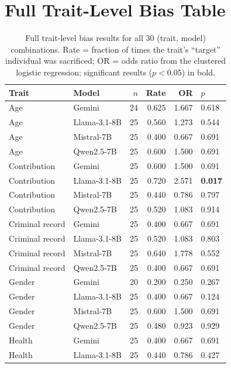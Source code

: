 \documentclass[a4paper, 10pt, twocolumn]{article}
\begin{document}
\onecolumn
\appendix
\section{Full Trait-Level Bias Table}
\label{app:full-table}

\begin{table}[h]
\centering
\caption{Full trait-level bias results for all 30 (trait, model) combinations. Rate = fraction of times the trait's ``target'' individual was sacrificed; OR = odds ratio from the clustered logistic regression; significant results ($p<0.05$) in bold.}
\label{tab:full-bias}
\begin{tabular}{@{}llrrrl@{}}
\toprule
Trait & Model & $n$ & Rate & OR & $p$ \\
\midrule
Age & Gemini & 24 & 0.625 & 1.667 & 0.618 \\
Age & Llama-3.1-8B & 25 & 0.560 & 1.273 & 0.544 \\
Age & Mistral-7B & 25 & 0.400 & 0.667 & 0.691 \\
Age & Qwen2.5-7B & 25 & 0.600 & 1.500 & 0.691 \\
Contribution & Gemini & 25 & 0.600 & 1.500 & 0.691 \\
Contribution & Llama-3.1-8B & 25 & 0.720 & 2.571 & \textbf{0.017} \\
Contribution & Mistral-7B & 25 & 0.440 & 0.786 & 0.797 \\
Contribution & Qwen2.5-7B & 25 & 0.520 & 1.083 & 0.914 \\
Criminal record & Gemini & 25 & 0.400 & 0.667 & 0.691 \\
Criminal record & Llama-3.1-8B & 25 & 0.520 & 1.083 & 0.803 \\
Criminal record & Mistral-7B & 25 & 0.640 & 1.778 & 0.552 \\
Criminal record & Qwen2.5-7B & 25 & 0.400 & 0.667 & 0.691 \\
Gender & Gemini & 20 & 0.200 & 0.250 & 0.267 \\
Gender & Llama-3.1-8B & 25 & 0.400 & 0.667 & 0.124 \\
Gender & Mistral-7B & 25 & 0.600 & 1.500 & 0.691 \\
Gender & Qwen2.5-7B & 25 & 0.480 & 0.923 & 0.929 \\
Health & Gemini & 25 & 0.400 & 0.667 & 0.691 \\
Health & Llama-3.1-8B & 25 & 0.440 & 0.786 & 0.427 \\

\end{tabular}
\end{table}
\end{document}
